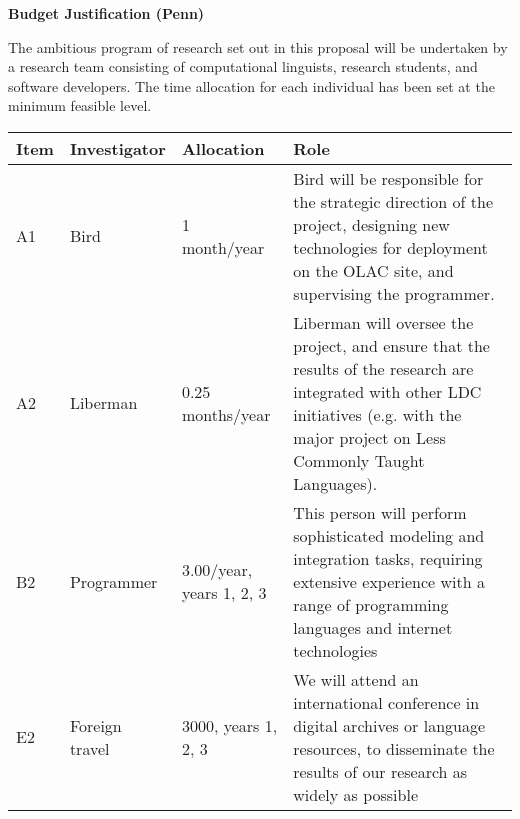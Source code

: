 \documentclass[11pt]{nsf}
\begin{document}
\begin{center}\textbf{\Large
Budget Justification (Penn)
}\end{center}

The ambitious program of research set out in this proposal will be
undertaken by a research team consisting of computational linguists,
research students, and software developers.  The time allocation for
each individual has been set at the minimum feasible level.

\vspace{1ex}

{\small\noindent
\begin{tabular}{lllp{3in}}
\textbf{Item} &
\textbf{Investigator} & \textbf{Allocation} & \textbf{Role} \\ \hline

A1 & Bird & 1 month/year &
Bird will be responsible for the strategic direction of the project,
designing new technologies for deployment on the OLAC site,
and supervising the programmer. \\

A2 & Liberman & 0.25 months/year &
Liberman will oversee the project, and ensure that the results of the
research are integrated with other LDC initiatives (e.g. with the
major project on Less Commonly Taught Languages).\\

B2 & Programmer & 3.00/year, years 1, 2, 3 &
This person will perform sophisticated modeling and integration tasks,
requiring extensive experience with a range of programming languages
and internet technologies \\

E2 & Foreign travel & 3000, years 1, 2, 3 &
We will attend an international conference in digital archives or
language resources, to disseminate the results of our research as
widely as possible \\

\end{tabular}}
\end{document}
